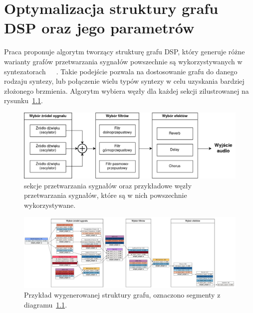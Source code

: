 \chapter{Optymalizacja struktury grafu DSP oraz jego parametrów}\label{chap:research}

Praca proponuje algorytm tworzący strukturę grafu DSP,
który generuje różne warianty grafów przetwarzania sygnałów powszechnie
są wykorzystywanych w syntezatorach~\cite{minilogue_diagram}~\cite{digitone_manual}~\cite{yamaha_dx7_manual}.
Takie podejście pozwala na dostosowanie grafu do danego rodzaju syntezy,
lub połączenie wielu typów syntezy w celu uzyskania bardziej złożonego brzmienia.
Algorytm wybiera węzły dla każdej sekcji
zilustrowanej na rysunku~\ref{fig:synth_architecture_diagram}.

\begin{figure}[h]
    \centering
    \includegraphics[width=1.0\linewidth]{rys06/synth_architecture.png}
    \caption{
      sekcje przetwarzania sygnałów oraz przykładowe węzły przetwarzania
      sygnałów, które są w nich powszechnie wykorzystywane.
    }\label{fig:synth_architecture_diagram}
\end{figure}

\begin{figure}[h]
    \centering
    \includegraphics[width=1.0\linewidth]{rys06/example_generated_graph.png}
    \caption{
      Przykład wygenerowanej struktury grafu, oznaczono segmenty z diagramu~\ref{fig:synth_architecture_diagram}.
    }\label{fig:example_generated_graph}
\end{figure}


